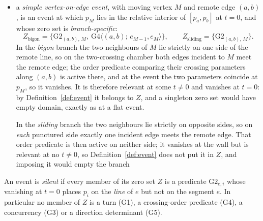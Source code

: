 \begin{convention}
\begin{itemize}
This is where an earlier revision of this document narrowed the domain. It
required the zero set to be exactly $\mathcal T_j$, which excludes every
threaded cusp. The witness, printed in Remark~\ref{rem:witnesses} in its
own indexing, has the cusp at $j=1$ on seven vertices: the trio vanishes as
$\tfrac25\to0\to-\tfrac25$ across the wall and the thread's member
$\mathrm{G4}_{4;1,7}$ as $-\tfrac{16}5\to0\to\tfrac{16}5$ --- oriented value
$\tfrac{16}5\to0\to-\tfrac{16}5$, the pair at $j=1$ wrapping --- the
thread crossing both legs on both sides --- while the cusp law and the main
theorem are both stated "threaded or not".
Phase 1.5 admitted those events under \emph{relative} simplicity; the clause
above is that condition printed. The enlarged zero set is still \emph{one}
condition: every added member is a nonzero multiple of $\mathrm{G1}_j$ near the
wall, so it vanishes and changes sign exactly when the turn does, which is the
flat bundle's pattern and is what the transversality requirement asks;
\item a \emph{simple vertex-on-edge event}, with moving vertex $M$ and remote
edge $(a,b)$, is an event at which $p_M$ lies in the relative interior of
$[p_a,p_b]$ at $t=0$, and whose zero set is \emph{branch-specific}:
\[
   Z_{\mathrm{bigon}}
   =\bigl\{\mathrm{G2}_{(a,b),\,M},\
     \mathrm{G4}\langle (a,b);\,e_{M-1},e_{M}\rangle\bigr\},
   \qquad
   Z_{\mathrm{sliding}}=\bigl\{\mathrm{G2}_{(a,b),\,M}\bigr\}.
\]
In the \emph{bigon} branch the two neighbours of $M$ lie strictly on one side of
the remote line, so on the two-crossing chamber both edges incident to $M$ meet
the remote edge; the order predicate comparing their crossing parameters along
$(a,b)$ is active there, and at the event the two parameters coincide at $p_M$,
so it vanishes. It is therefore relevant at some $t\neq0$ and vanishes at
$t=0$: by Definition~\ref{def:event} it belongs to $Z$, and a singleton zero
set would have empty domain, exactly as at a flat event.

In the \emph{sliding} branch the two neighbours lie strictly on opposite sides,
so on \emph{each} punctured side exactly one incident edge meets the remote
edge. That order predicate is then active on neither side; it vanishes at the
wall but is relevant at no $t\neq0$, so Definition~\ref{def:event} does not put
it in $Z$, and imposing it would empty the branch
\end{itemize}
\end{convention}

\begin{definition}\label{def:silent}
An event is \emph{silent} if every member of its zero set $Z$ is a predicate
$\mathrm{G2}_{e,i}$ whose vanishing at $t=0$ places $p_i$ on the \emph{line} of
$e$ but not on the segment $e$. In particular no member of $Z$ is a turn (G1),
a crossing-order predicate (G4), a concurrency (G3) or a direction determinant
(G5).
\end{definition}

